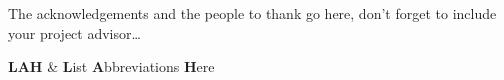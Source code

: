 \documentclass[11pt, oneside]{Thesis} %
\begin{document}
{{The acknowledgements and the people to thank go here, don't forget to include your project advisor\ldots
}
\clearpage %


\pagestyle{fancy} %

\tableofcontents %

\listoffigures %

\listoftables %


\clearpage %


{
\textbf{LAH} & \textbf{L}ist \textbf{A}bbreviations \textbf{H}ere \\
}



\pagestyle{empty} %



}
\end{document}
